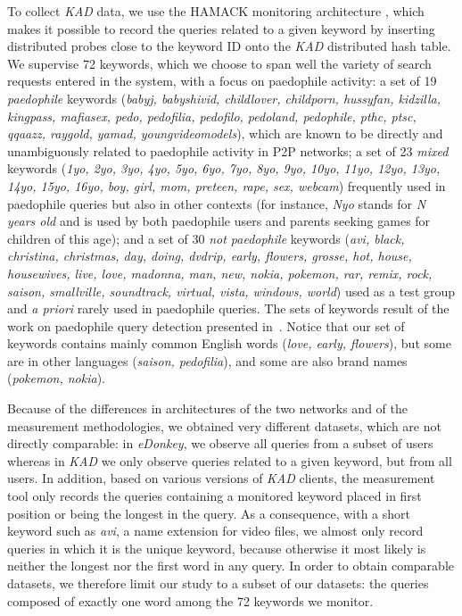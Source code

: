 \documentclass[a4paper,oneside,12pt]{article}
\newcommand{\edonkey}{{\em eDonkey}\xspace}
\newcommand{\kad}{{\em KAD}\xspace}
\newcommand{\paedo}{{\em paedophile}\xspace}
\newcommand{\notpaedo}{{\em not paedophile}\xspace}
\newcommand{\mixed}{{\em mixed}\xspace}
\newcommand{\ipm}{\cite{QuantifyingIPM}\xspace}
\begin{document}
To collect \kad data, we use the HAMACK monitoring architecture \cite{cholez2010}, which makes it possible to record the queries related to a given keyword by inserting distributed probes close to the keyword ID onto the \kad distributed hash table. We supervise 72 keywords, which we choose to span well the variety of search requests entered in the system, with a focus on paedophile activity: a set of 19 \paedo keywords (\textit{babyj, babyshivid, childlover, childporn, hussyfan, kidzilla, kingpass, mafiasex, pedo, pedofilia, pedofilo, pedoland, pedophile, pthc, ptsc, qqaazz, raygold, yamad, youngvideomodels}),  which are known to be directly and unambiguously related to paedophile activity in P2P networks; a set of 23 \mixed keywords (\textit{1yo, 2yo, 3yo, 4yo, 5yo, 6yo, 7yo, 8yo, 9yo, 10yo, 11yo, 12yo, 13yo, 14yo, 15yo, 16yo, boy, girl, mom, preteen, rape, sex, webcam}) frequently used in paedophile queries but also in other contexts (for instance,  {\em Nyo} stands for {\em N years old} and is used by both paedophile users and parents seeking games for children of this age); and a set of 30 \notpaedo keywords (\textit {avi, black, christina, christmas, day, doing, dvdrip, early, flowers, grosse, hot, house, housewives, live, love, madonna, man, new, nokia, pokemon, rar, remix, rock, saison, smallville, soundtrack, virtual, vista, windows, world}) used as a test group and {\em a priori} rarely used in paedophile queries. The sets of keywords result of the work on paedophile query detection presented in~\ipm. Notice that our set of keywords contains mainly common English words ({\em love,  early,  flowers}), but some are in other languages ({\em saison,  pedofilia}), and some are also brand names ({\em pokemon, nokia}).

Because of the differences in architectures of the two networks and of the measurement methodologies, we obtained very different datasets, which are not directly comparable: in \edonkey, we observe all queries from a subset of users whereas in \kad we only observe queries related to a given keyword, but from all users. In addition, based on various versions of \kad clients, the measurement tool only records the queries containing a monitored keyword placed in first position or being the longest in the query. As a consequence, with a short keyword such as {\em avi}, a name extension for video files, we almost only record queries in which it is the unique keyword, because otherwise it most likely is neither the longest nor the first word in any query. In order to obtain comparable datasets, we therefore limit our study to a subset of our datasets: the queries composed of exactly one word among the 72 keywords we monitor. 
\end{document}

